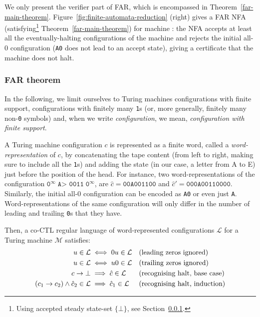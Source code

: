 We only present the verifier part of FAR, which is encompassed in Theorem~\ref{far-main-theorem}. Figure~\ref{fig:finite-automata-reduction} (right) gives a FAR NFA (\ie satisfying\footnote{Using accepted steady state-set $\{\bot\}$, see Section~\ref{sec:FAR:theorem}.} Theorem~\ref{far-main-theorem}) for machine : the NFA accepts at least all the eventually-halting configurations of the machine and rejects the initial all-0 configuration (\ie \texttt{A0} does not lead to an accept state), giving a certificate that the machine does not halt.

\subsubsection{FAR theorem}\label{sec:FAR:theorem}

In the following, we limit ourselves to Turing machines configurations with finite support, \ie configurations with finitely many \texttt{1}s (or, more generally, finitely many non-\texttt{0} symbols) and, when we write \textit{configuration}, we mean, \textit{configuration with finite support}.

A Turing machine configuration $c$ is represented as a finite word, called a \textit{word-representation} of $c$, by concatenating the tape content (from left to right, making sure to include all the \texttt{1}s) and adding the state (in our case, a letter from A to E) just before the position of the head. For instance, two word-representations of the configuration $\texttt{0}^\infty \; \texttt{A> 0011} \; \texttt{0}^\infty$, are $\hat{c} = \texttt{00A001100}$ and $\hat{c}' = \texttt{000A00110000}$. Similarly, the initial all-0 configuration can be encoded as \texttt{A0} or even just \texttt{A}. Word-representations of the same configuration will only differ in the number of leading and trailing \texttt{0}s that they have.


Then, a co-CTL regular language of word-represented configurations $\mathcal{L}$ for a Turing machine $\mathcal{M}$ satisfies:
\begin{align}
    u \in \mathcal{L}                               & \iff 0u \in \mathcal{L}           &  & \text{(leading zeros ignored)}
    \label{eq:lzignore}
    \\
    u \in \mathcal{L}                               & \iff u0 \in \mathcal{L}           &  & \text{(trailing zeros ignored)}
    \label{eq:tzignore}
    \\
    c\to\bot                                    & \implies \hat{c} \in \mathcal{L}  &  & \text{(recognising halt, base case)} \nonumber \\
    (c_1\to c_2)\land \hat{c}_2 \in \mathcal{L} & \implies\hat{c}_1 \in \mathcal{L} &  & \text{(recognising halt, induction)} \nonumber
\end{align}


